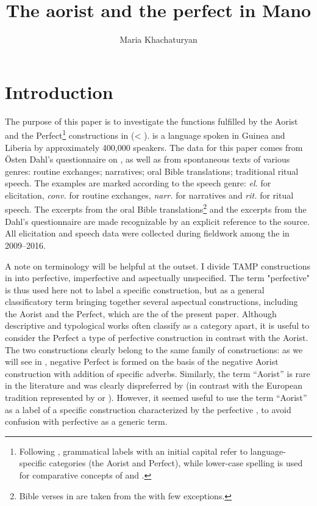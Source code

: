 \documentclass[output=paper]{LSP/langsci}
\author{Maria Khachaturyan\affiliation{UC Berkeley} }
\title{The aorist and the perfect in Mano}
\begin{document}
\newcommand{\emphkh}[1]{\textit{#1}} %

\section{Introduction} %
The purpose of this paper is to investigate the functions fulfilled by the Aorist and the Perfect\footnote{Following \citet{khachhasp}, grammatical labels with an initial capital refer to language-specific categories (the  Aorist and Perfect), while lower-case spelling is used for comparative concepts of  and .} constructions in  (< ).  is a  language spoken in Guinea and Liberia by approximately 400,000 speakers. The data for this paper comes from Östen Dahl’s questionnaire on  \citep{khachdahl2000}, as well as from spontaneous texts of various genres: routine exchanges; narratives; oral Bible translations; traditional ritual speech. The examples are marked according to the speech genre: \textit{el.} for elicitation, \textit{conv.} for routine exchanges, \textit{narr.} for narratives and \textit{rit.} for ritual speech. The excerpts from the oral Bible translations\footnote{Bible verses in  are taken from the \citealt{khachNIV} with few exceptions.} and the excerpts from the Dahl's questionnaire are made recognizable by an explicit reference to the source. All elicitation and speech data were collected during fieldwork among the  in 2009--2016.

A note on terminology will be helpful at the outset. I divide TAMP constructions in  into perfective, imperfective and aspectually unspecified. The term "perfective" is thus used here not to label a specific construction, but as a general classificatory term bringing together several aspectual constructions, including the Aorist and the Perfect, which are the  of the present paper. Although descriptive and typological works often classify  as a category apart, it is useful to consider the  Perfect a type of perfective construction in contrast with the Aorist. The two constructions clearly belong to the same family of constructions: as we will see in , negative Perfect is formed on the basis of the negative Aorist construction with addition of specific adverbs. Similarly, the term ``Aorist'' is rare in the literature and was clearly dispreferred by \citet{khachcomrie1976} (in contrast with the European tradition represented by \citet{khachplung2016} or \citet{khachmaisak2016}). However, it seemed useful to use the term ``Aorist'' as a label of a specific construction characterized by the perfective , to avoid confusion with perfective as a generic term. 
\end{document}
